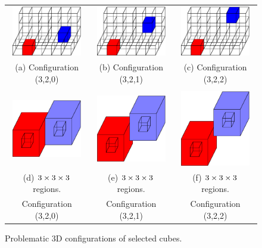 \begin{figure}
\centering

\begin{tabular}{ccc}
\includegraphics[width=1.2in]{images/config3D_3_2_0.eps} \qquad &
\qquad
\includegraphics[width=1.2in]{images/config3D_3_2_1.eps}
\qquad &
\qquad
\includegraphics[width=1.2in]{images/config3D_3_2_2.eps} \\
(a) Configuration (3,2,0) & (b) Configuration (3,2,1) 
  & (c) Configuration (3,2,2) \\
\\
\includegraphics[width=1.2in]{images/config3D_3_2_0_3x3x3.eps} \qquad &
\qquad
\includegraphics[width=1.2in]{images/config3D_3_2_1_3x3x3.eps}
\qquad &
\qquad
\includegraphics[width=1.2in]{images/config3D_3_2_2_3x3x3.eps} \\
(d) $3 \times 3 \times 3$ regions. & (e) $3 \times 3 \times 3$ regions.
  & (f) $3 \times 3 \times 3$ regions.\\
Configuration (3,2,0) & Configuration (3,2,1) 
  & Configuration (3,2,2)
\end{tabular}
\caption{Problematic 3D configurations of selected cubes.}
\label{fig:loose3D}
\end{figure}

